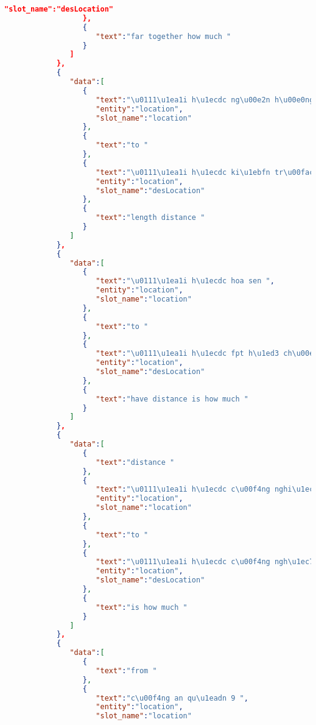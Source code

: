 \begin{lstlisting}[language=json,firstnumber=1]
                     "slot_name":"desLocation"
                  },
                  {
                     "text":"far together how much "
                  }
               ]
            },
            {
               "data":[
                  {
                     "text":"\u0111\u1ea1i h\u1ecdc ng\u00e2n h\u00e0ng tp. hcm ",
                     "entity":"location",
                     "slot_name":"location"
                  },
                  {
                     "text":"to "
                  },
                  {
                     "text":"\u0111\u1ea1i h\u1ecdc ki\u1ebfn tr\u00fac th\u00e0nh ph\u1ed1 h\u1ed3 ch\u00ed minh ",
                     "entity":"location",
                     "slot_name":"desLocation"
                  },
                  {
                     "text":"length distance "
                  }
               ]
            },
            {
               "data":[
                  {
                     "text":"\u0111\u1ea1i h\u1ecdc hoa sen ",
                     "entity":"location",
                     "slot_name":"location"
                  },
                  {
                     "text":"to "
                  },
                  {
                     "text":"\u0111\u1ea1i h\u1ecdc fpt h\u1ed3 ch\u00ed minh ",
                     "entity":"location",
                     "slot_name":"desLocation"
                  },
                  {
                     "text":"have distance is how much "
                  }
               ]
            },
            {
               "data":[
                  {
                     "text":"distance "
                  },
                  {
                     "text":"\u0111\u1ea1i h\u1ecdc c\u00f4ng nghi\u1ec7p th\u00e0nh ph\u1ed1 h\u1ed3 ch\u00ed minh ",
                     "entity":"location",
                     "slot_name":"location"
                  },
                  {
                     "text":"to "
                  },
                  {
                     "text":"\u0111\u1ea1i h\u1ecdc c\u00f4ng ngh\u1ec7 th\u00f4ng tin - \u0111h qu\u1ed1c gia tp.hcm ",
                     "entity":"location",
                     "slot_name":"desLocation"
                  },
                  {
                     "text":"is how much "
                  }
               ]
            },
            {
               "data":[
                  {
                     "text":"from "
                  },
                  {
                     "text":"c\u00f4ng an qu\u1eadn 9 ",
                     "entity":"location",
                     "slot_name":"location"

\end{lstlisting}
